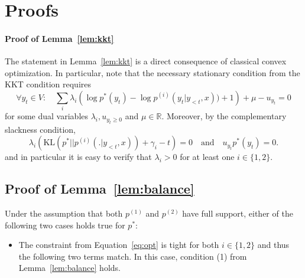 \newpage
 
\section{Proofs}

\paragraph{Proof of Lemma~\ref{lem:kkt}}
The statement in  Lemma~\ref{lem:kkt} is a direct consequence of classical convex optimization. 
In particular, note that the necessary stationary condition from the KKT condition requires
\begin{equation}
\forall y_t \in V: \quad 
    \sum_{i} \lambda_i \left( \log p^*(y_t ) -  \log p^{(i)}(y_t \vert y_{<t}, x) ) + 1\right)  + \mu -  u_{y_t} = 0
\end{equation}
for some dual variables $\lambda_i,  u_{y_t \geq 0}$  and $\mu \in \mathbb R$. Moreover, by the complementary slackness condition,
\begin{equation}
\lambda_i \left(\text{KL}( p^*\vert \vert p^{(i)}(. \vert y_{<t}, x) ) + \gamma_i- t\right) = 0 \quad \text{and}\quad  u_{y_t} p^*(y_t ) =0.
\end{equation}
and in particular it is easy to verify that $\lambda_i >0$ for at least one $i\in \{1,2\}$. 
 
 \subsection{Proof of Lemma~\ref{lem:balance}}
Under the assumption that both $p^{(1)}$ and $p^{(2)}$ have full support, either of the following two cases holds true for $p^*$:
\begin{itemize}
    \item The  constraint from Equation~\eqref{eq:opt} is tight for both $i\in\{1,2\}$ and thus the following two terms match. In this case,  condition (1) from Lemma~\ref{lem:balance} holds.
\end{itemize}

